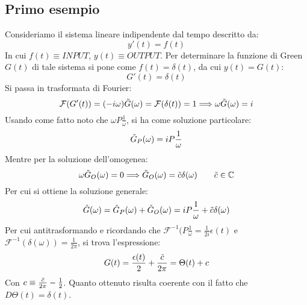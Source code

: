 \documentclass[twoside]{article}
\begin{document}
\subsection{Primo esempio}
Consideriamo il sistema lineare indipendente dal tempo descritto da:
\begin{equation}
    y'(t)=f(t)
\end{equation}
In cui $f(t)\equiv INPUT$, $y(t)\equiv OUTPUT$.
Per determinare la funzione di Green $G(t)$ di tale sistema si pone come $f(t)=\delta(t)$, da cui $y(t)=G(t)$:
\begin{equation}
    G'(t)=\delta(t)
\end{equation}
Si passa in trasformata di Fourier:
\begin{equation}
    \mathcal{F}(G'(t))=(-i\omega)\Tilde{G}(\omega)=\mathcal{F}(\delta(t))=1 \Longrightarrow \omega\Tilde{G}(\omega)=i
\end{equation}
Usando come fatto noto che $\omega P \frac{1}{\omega}$, si ha come soluzione particolare:
\begin{equation}
    \Tilde{G}_P(\omega)=iP\frac{1}{\omega}
\end{equation}
Mentre per la soluzione dell'omogenea:
\begin{equation}
    \omega \Tilde{G}_O(\omega)=0 \Longrightarrow \Tilde{G}_O(\omega)=\Tilde{c}\delta(\omega) \qquad \Tilde{c}\in \mathbb{C}
\end{equation}
Per cui si ottiene la soluzione generale:
\begin{equation}
    \Tilde{G}(\omega)=\Tilde{G}_P(\omega)+\Tilde{G}_O(\omega)=iP\frac{1}{\omega}+\Tilde{c}\delta(\omega)
\end{equation}
Per cui antitrasformando e ricordando che $\mathcal{F}^{-1}(P\frac{1}{\omega}=\frac{1}{2i}\epsilon(t)$ e $\mathcal{F}^{-1}(\delta(\omega))=\frac{1}{2\pi}$, si trova l'espressione:
\begin{equation}
    G(t)=\frac{\epsilon(t)}{2}+\frac{\Tilde{c}}{2\pi}=\Theta(t)+c
\end{equation}
Con $c\equiv \frac{\Tilde{c}}{2\pi}-\frac{1}{2}$.
Quanto ottenuto risulta coerente con il fatto che $D\Theta(t)=\delta(t)$.
\end{document}

